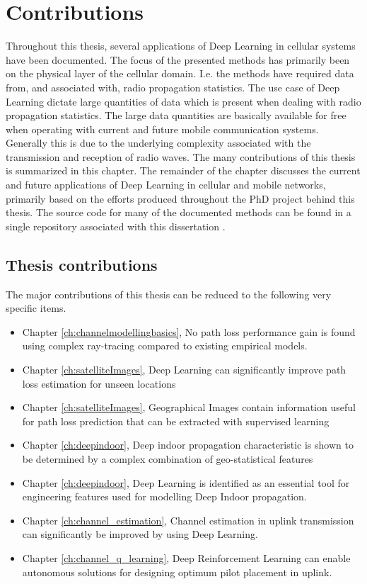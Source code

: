 \chapter{Contributions}\label{ch:contributions}

Throughout this thesis, several applications of Deep Learning in cellular systems have been documented. The focus of the presented methods has primarily been on the physical layer of the cellular domain. I.e. the methods have required data from, and associated with, radio propagation statistics. The use case of Deep Learning dictate large quantities of data which is present when dealing with radio propagation statistics. The large data quantities are basically available for free when operating with current and future mobile communication systems. Generally this is due to the underlying complexity associated with the transmission and reception of radio waves. The many contributions of this thesis is summarized in this chapter. The remainder of the chapter discusses the current and future applications of Deep Learning in cellular and mobile networks, primarily based on the efforts produced throughout the PhD project behind this thesis. The source code for many of the documented methods can be found in a single repository associated with this dissertation \cite{Thrane2020RepositoryLearning}.

\section{Thesis contributions}

The major contributions of this thesis can be reduced to the following very specific items. 

\begin{itemize}
    \item Chapter \ref{ch:channelmodellingbasics}, No path loss performance gain is found using complex ray-tracing compared to existing empirical models.
    \item Chapter \ref{ch:satelliteImages}, Deep Learning can significantly improve path loss estimation for unseen locations
    \item Chapter \ref{ch:satelliteImages}, Geographical Images contain information useful for path loss prediction that can be extracted with supervised learning
    \item Chapter \ref{ch:deepindoor}, Deep indoor propagation characteristic is shown to be determined by a complex combination of geo-statistical features
    \item Chapter \ref{ch:deepindoor}, Deep Learning is identified as an essential tool for engineering features used for modelling Deep Indoor propagation.
    \item Chapter \ref{ch:channel_estimation}, Channel estimation in uplink transmission can significantly be improved by using Deep Learning.
    \item Chapter \ref{ch:channel_q_learning}, Deep Reinforcement Learning can enable autonomous solutions for designing optimum pilot placement in uplink.
\end{itemize}


